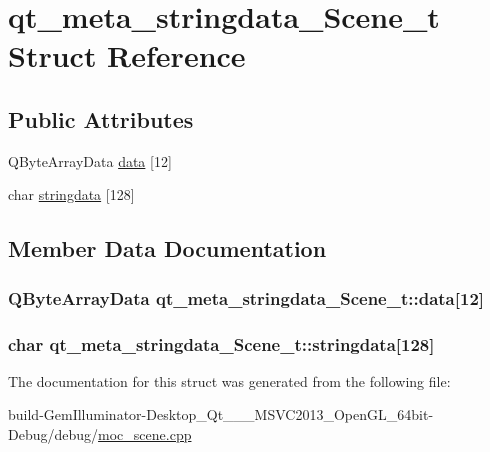 \hypertarget{structqt__meta__stringdata___scene__t}{\section{qt\+\_\+meta\+\_\+stringdata\+\_\+\+Scene\+\_\+t Struct Reference}
\label{structqt__meta__stringdata___scene__t}
}
\subsection*{Public Attributes}
\begin{DoxyCompactItemize}
\item 
Q\+Byte\+Array\+Data \hyperlink{structqt__meta__stringdata___scene__t_a01246b628bf8c2aa18002772b97da01c}{data} \mbox{[}12\mbox{]}
\item 
char \hyperlink{structqt__meta__stringdata___scene__t_a593b55f5ae8e68bc3104967159148e5f}{stringdata} \mbox{[}128\mbox{]}
\end{DoxyCompactItemize}


\subsection{Member Data Documentation}
\hypertarget{structqt__meta__stringdata___scene__t_a01246b628bf8c2aa18002772b97da01c}{
\subsubsection[{data}]{\setlength{\rightskip}{0pt plus 5cm}Q\+Byte\+Array\+Data qt\+\_\+meta\+\_\+stringdata\+\_\+\+Scene\+\_\+t\+::data\mbox{[}12\mbox{]}}}\label{structqt__meta__stringdata___scene__t_a01246b628bf8c2aa18002772b97da01c}
\hypertarget{structqt__meta__stringdata___scene__t_a593b55f5ae8e68bc3104967159148e5f}{
\subsubsection[{stringdata}]{\setlength{\rightskip}{0pt plus 5cm}char qt\+\_\+meta\+\_\+stringdata\+\_\+\+Scene\+\_\+t\+::stringdata\mbox{[}128\mbox{]}}}\label{structqt__meta__stringdata___scene__t_a593b55f5ae8e68bc3104967159148e5f}


The documentation for this struct was generated from the following file\+:\begin{DoxyCompactItemize}
\item 
build-\/\+Gem\+Illuminator-\/\+Desktop\+\_\+\+Qt\+\_\+\_\+\_\+\+M\+S\+V\+C2013\+\_\+\+Open\+G\+L\+\_\+64bit-\/\+Debug/debug/\hyperlink{moc__scene_8cpp}{moc\+\_\+scene.\+cpp}\end{DoxyCompactItemize}
